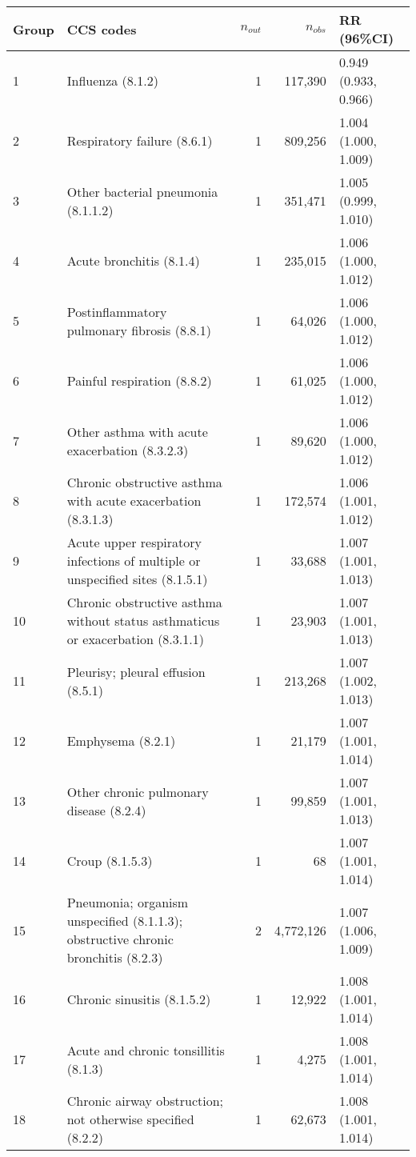 \begin{tabular}{lp{6.5cm}rrp{2.2cm}}
  \hline
Group & CCS codes & $n_{out}$ & $n_{obs}$ & RR (96\%CI) \\ 
  \hline
   1 & Influenza (8.1.2) &    1 & 117,390 & 0.949 (0.933, 0.966) \\ 
     2 & Respiratory failure (8.6.1) &    1 & 809,256 & 1.004 (1.000, 1.009) \\ 
     3 & Other bacterial pneumonia (8.1.1.2) &    1 & 351,471 & 1.005 (0.999, 1.010) \\ 
     4 & Acute bronchitis (8.1.4) &    1 & 235,015 & 1.006 (1.000, 1.012) \\ 
     5 & Postinflammatory pulmonary fibrosis (8.8.1) &    1 & 64,026 & 1.006 (1.000, 1.012) \\ 
     6 & Painful respiration (8.8.2) &    1 & 61,025 & 1.006 (1.000, 1.012) \\ 
     7 & Other asthma with acute exacerbation (8.3.2.3) &    1 & 89,620 & 1.006 (1.000, 1.012) \\ 
     8 & Chronic obstructive asthma with acute exacerbation (8.3.1.3) &    1 & 172,574 & 1.006 (1.001, 1.012) \\ 
     9 & Acute upper respiratory infections of multiple or unspecified sites (8.1.5.1) &    1 & 33,688 & 1.007 (1.001, 1.013) \\ 
    10 & Chronic obstructive asthma without status asthmaticus or exacerbation (8.3.1.1) &    1 & 23,903 & 1.007 (1.001, 1.013) \\ 
    11 & Pleurisy; pleural effusion (8.5.1) &    1 & 213,268 & 1.007 (1.002, 1.013) \\ 
    12 & Emphysema (8.2.1) &    1 & 21,179 & 1.007 (1.001, 1.014) \\ 
    13 & Other chronic pulmonary disease (8.2.4) &    1 & 99,859 & 1.007 (1.001, 1.013) \\ 
    14 & Croup (8.1.5.3) &    1 & 68 & 1.007 (1.001, 1.014) \\ 
    15 & Pneumonia; organism unspecified (8.1.1.3); obstructive chronic bronchitis (8.2.3) &    2 & 4,772,126 & 1.007 (1.006, 1.009) \\ 
    16 & Chronic sinusitis (8.1.5.2) &    1 & 12,922 & 1.008 (1.001, 1.014) \\ 
    17 & Acute and chronic tonsillitis (8.1.3) &    1 & 4,275 & 1.008 (1.001, 1.014) \\ 
    18 & Chronic airway obstruction; not otherwise specified (8.2.2) &    1 & 62,673 & 1.008 (1.001, 1.014) \\ 

\end{tabular}
